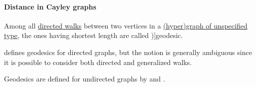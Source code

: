 \paragraph{Distance in Cayley graphs}

\begin{definition}\label{def:graph_geodesic}
  Among all \hyperref[def:graph_walk/directed]{directed walks} between two vertices in a \hyperref[rem:graph_of_unspecified_type]{(hyper)graph of unspecified type}, the ones having shortest length are called \term[ru=геодезические (цепи) (\cite[\S 7.2.5]{Новиков2013ДискретнаяМатематика})]{geodesic}.
\end{definition}
\begin{comments}
  \item \Textcite[1]{Bollobás1984GeodesicsInOrientedGraphs} defines geodesics for directed graphs, but the notion is generally ambiguous since it is possible to consider both directed and generalized walks.

  Geodesics are defined for undirected graphs by \textcite[14]{Harary1969GraphTheory} and \textcite[\S 7.2.5]{Новиков2013ДискретнаяМатематика}.
\end{comments}

